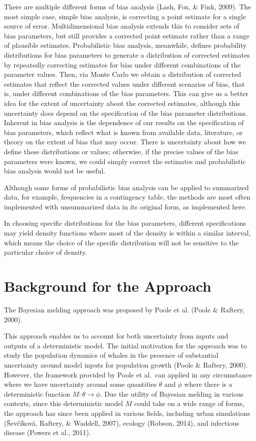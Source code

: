 \documentclass[12pt,twoside]{smiththesis}
\begin{document}
There are multiple different forms of bias analysis (Lash, Fox, \& Fink, 2009). The most simple case, simple bias analysis, is correcting a point estimate for a single source of error. Multidimensional bias analysis extends this to consider sets of bias parameters, but still provides a corrected point estimate rather than a range of plausible estimates. Probabilistic bias analysis, meanwhile, defines probability distributions for bias parameters to generate a distribution of corrected estimates by repeatedly correcting estimates for bias under different combinations of the parameter values. Then, via Monte Carlo we obtain a distribution of corrected estimates that reflect the corrected values under different scenarios of bias, that is, under different combinations of the bias parameters. This can give us a better idea for the extent of uncertainty about the corrected estimates, although this uncertainty does depend on the specification of the bias parameter distributions. Inherent in bias analysis is the dependence of our results on the specification of bias parameters, which reflect what is known from available data, literature, or theory on the extent of bias that may occur. There is uncertainty about how we define these distributions or values; otherwise, if the precise values of the bias parameters were known, we could simply correct the estimates and probabilistic bias analysis would not be useful.

Although some forms of probabilistic bias analysis can be applied to summarized data, for example, frequencies in a contingency table, the methods are most often implemented with unsummarized data in its original form, as implemented here.

In choosing specific distributions for the bias parameters, different specifications may yield density functions where most of the density is within a similar interval, which means the choice of the specific distribution will not be sensitive to the particular choice of density.

\hypertarget{background-for-the-approach}{%
\section{Background for the Approach}\label{background-for-the-approach}}

The Bayesian melding approach was proposed by Poole et al. (Poole \& Raftery, 2000).

This approach enables us to account for both uncertainty from inputs and outputs of a deterministic model. The initial motivation for the approach was to study the population dynamics of whales in the presence of substantial uncertainty around model inputs for population growth (Poole \& Raftery, 2000). However, the framework provided by Poole et al.~can applied in any circumstance where we have uncertainty around some quantities \(\theta\) and \(\phi\) where there is a deterministic function \(M:\theta \to\phi\). Due the utility of Bayesian melding in various contexts, since this deterministic model \(M\) could take on a wide range of forms, the approach has since been applied in various fields, including urban simulations (Ševčíková, Raftery, \& Waddell, 2007), ecology (Robson, 2014), and infectious disease (Powers et al., 2011).
\end{document}
